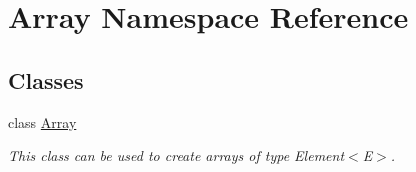 \hypertarget{namespace_array}{}\section{Array Namespace Reference}
\label{namespace_array}
\subsection*{Classes}
\begin{DoxyCompactItemize}
\item 
class \hyperlink{class_array_1_1_array}{Array}
\begin{DoxyCompactList}\small\item\em This class can be used to create arrays of type Element$<$\+E$>$. \end{DoxyCompactList}\end{DoxyCompactItemize}

